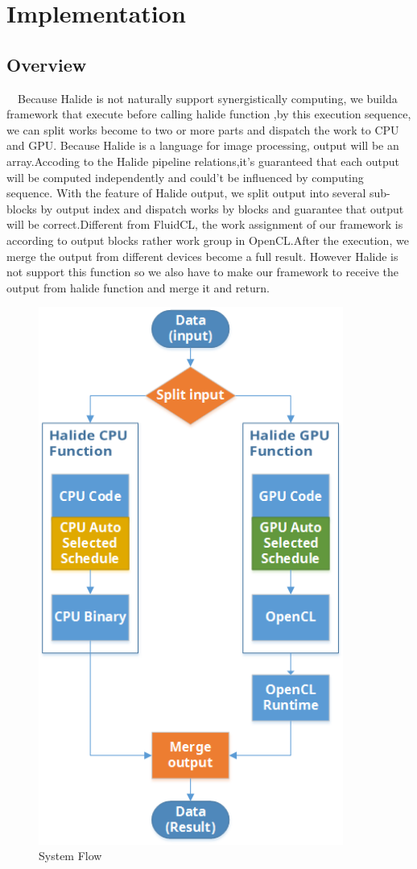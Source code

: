 \chapter{Implementation}
\section{Overview}
\quad \ \ Because Halide is not naturally support synergistically computing, we builda framework that execute before calling halide function ,by this execution sequence, we can split works become to two or more parts and dispatch the work to CPU and GPU. Because Halide is a language for image processing, output will be an array.Accoding to the Halide pipeline relations,it's guaranteed that each output will be computed independently and could't be influenced by computing sequence.
With the feature of Halide output, we split output into several sub-blocks by output index and dispatch works by blocks and guarantee that output will be correct.Different from FluidCL, the work assignment of our framework is according to output blocks rather work group in OpenCL.After the execution, we merge the output from different devices become a full result. However Halide is not support this function so we also have to make our framework to receive the output from halide function and merge it and return.

\begin{figure}[H]
\centering
\includegraphics[width=10cm]{img/Framework-SystemFlow.png}
\caption{System Flow}
\label{fig:my_label}
\end{figure}

